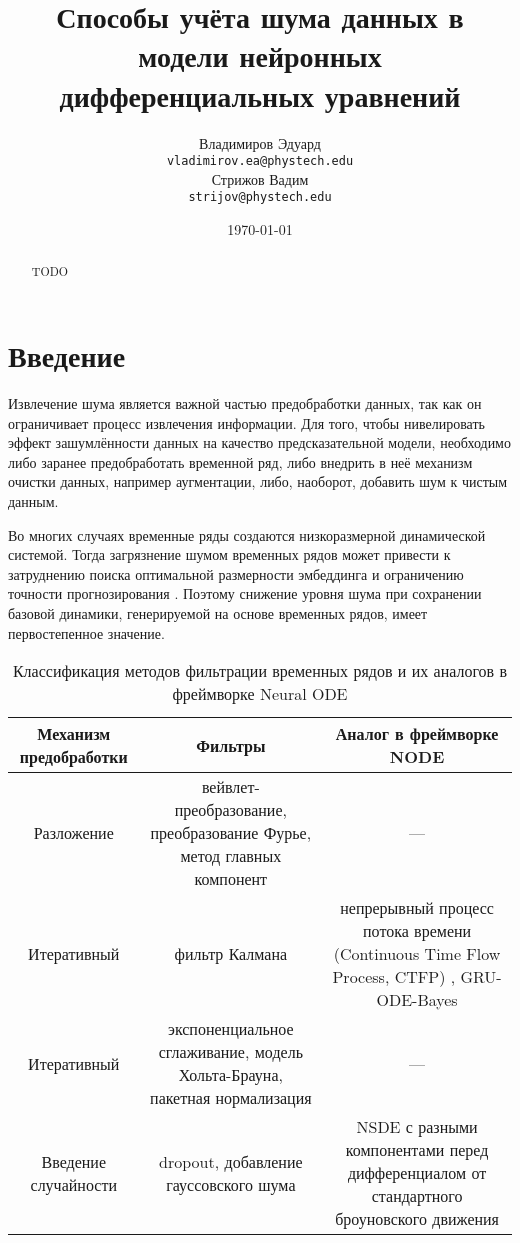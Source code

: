 \documentclass[a4paper, 14pt]{article}
\title{Способы учёта шума данных в модели нейронных дифференциальных уравнений}
\author{Владимиров Эдуард \\
	\texttt{vladimirov.ea@phystech.edu} \\
	
	\And
	Стрижов Вадим \\
	\texttt{strijov@phystech.edu}
}
\date{\today}
\begin{document}
	\maketitle
	
	\begin{abstract}
		TODO
	\end{abstract}
	
	
	\section{Введение}
	Извлечение шума является важной частью предобработки данных, так как он ограничивает процесс извлечения информации. 
	Для того, чтобы нивелировать эффект зашумлённости данных на качество предсказательной модели, необходимо либо заранее предобработать временной ряд, либо внедрить в неё механизм очистки данных, например аугментации, либо, наоборот, добавить шум к чистым данным.
	
	Во многих случаях временные ряды создаются низкоразмерной динамической системой.
	Тогда загрязнение шумом временных рядов может привести к затруднению поиска оптимальной размерности эмбеддинга \cite{kostelich1990noise} и ограничению точности прогнозирования \cite{elshorbagy2002noise}. Поэтому снижение
	уровня шума при сохранении базовой динамики, генерируемой на основе временных рядов, имеет первостепенное значение.
	
	\begin{table}[bhtp]
		\caption{Классификация методов фильтрации временных рядов и их аналогов в фреймворке Neural ODE}
		\begin{tabulary}{\textwidth}{|C|C|C|}
			\hline
			\textbf{Механизм предобработки} & \textbf{Фильтры} & \textbf{Аналог в фреймворке NODE} 
			\\ \hline
			Разложение & вейвлет-преобразование, преобразование Фурье, метод главных компонент & --- 
			\\ \hline
			Итеративный & фильтр Калмана & непрерывный процесс потока времени (Continuous Time Flow Process, CTFP) \cite{Deng2020}, GRU-ODE-Bayes \cite{DeBrouwer2020}
			\\ \hline
			Итеративный & экспоненциальное сглаживание, модель Хольта-Брауна, пакетная нормализация & ---
			\\ \hline
			Введение случайности & dropout, добавление гауссовского шума
			& NSDE с разными компонентами перед дифференциалом от стандартного броуновского движения \cite{Liu2019}
			\\ \hline
		\end{tabulary}
	\end{table}
	
\end{document}
